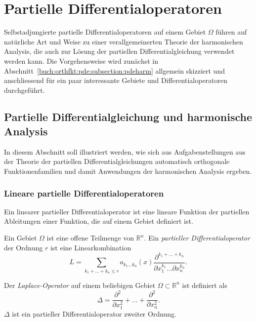 %
%
%
\section{Partielle Differentialoperatoren
\label{buch:orthofkt:section:pde}}
Selbstadjungierte partielle Differentialoperatoren auf einem Gebiet 
$\Omega$ führen auf natürliche Art und Weise zu einer verallgemeinerten
Theorie der harmonischen Analysis, die auch zur Lösung der
partiellen Differentialgleichung verwendet werden kann.
Die Vorgehensweise wird zunächst in
Abschnitt~\ref{buch:orthfkt:pde:subsection:pdeharm}
allgemein skizziert und anschliessend für ein paar interessante
Gebiete und Differentialoperatoren durchgeführt.

%
%
\subsection{Partielle Differentialgleichung und harmonische Analysis
\label{buch:orthfkt:pde:subsection:pdeharm}}
In diesem Abschnitt soll illustriert werden, wie sich aus Aufgabenstellungen
aus der Theorie der partiellen Differentialgleichungen 
automatisch orthogonale Funktionenfamilien und damit Anwendungen
der harmonischen Analysis ergeben.

%
%
\subsubsection{Lineare partielle Differentialoperatoren}
Ein linearer partieller Differentialoperator ist eine lineare
Funktion der partiellen Ableitungen einer Funktion, die auf einem
Gebiet definiert ist.

\begin{definition}
Ein Gebiet $\Omega$ ist eine offene Teilmenge von $\mathbb{R}^n$.
Ein {\em partieller Differentialoperator} der Ordnung $r$ ist eine
Linearkombination
%
%
\[
L
=
\sum_{k_1+\dots+k_n\le r}
a_{k_1\dots k_n}(x)
\frac{\partial^{k_1+\dots+k_n}}{\partial x_1^{k_1}\dots\partial x_n^{k_n}}.
\]
\end{definition}

\begin{beispiel}
Der {\em Laplace-Operator} auf einem beliebigen Gebiet
$\Omega\subset\mathbb{R}^n$
ist definiert als
\[
\Delta
=
\frac{\partial^2}{\partial x_1^2}
+
\dots
+
\frac{\partial^2}{\partial x_n^2}.
\]
$\Delta$ ist ein partieller Differentialoperator zweiter Ordnung.
\end{beispiel}

